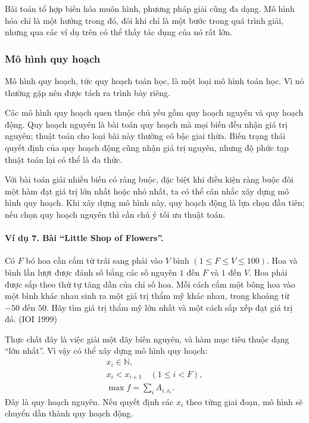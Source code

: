 \documentclass[11pt]{article}
\begin{document}
Bài toán tổ hợp biến hóa muôn hình, phương pháp giải cũng đa dạng. Mô hình hóa
chỉ là một hướng trong đó, đôi khi chỉ là một bước trong quá trình giải, nhưng
qua các ví dụ trên có thể thấy tác dụng của nó rất lớn.

\subsubsection{Mô hình quy hoạch}

Mô hình quy hoạch, tức quy hoạch toán học, là một loại mô hình toán học. Vì nó
thường gặp nên được tách ra trình bày riêng.

Các mô hình quy hoạch quen thuộc chủ yếu gồm quy hoạch nguyên và quy hoạch
động. Quy hoạch nguyên là bài toán quy hoạch mà mọi biến đều nhận giá trị
nguyên; thuật toán cho loại bài này thường có bậc giai thừa. Biến trạng thái
quyết định của quy hoạch động cũng nhận giá trị nguyên, nhưng độ phức tạp thuật
toán lại có thể là đa thức.

Với bài toán giải nhiều biến có ràng buộc, đặc biệt khi điều kiện ràng buộc
đòi một hàm đạt giá trị lớn nhất hoặc nhỏ nhất, ta có thể cân nhắc xây dựng mô
hình quy hoạch. Khi xây dựng mô hình này, quy hoạch động là lựa chọn đầu tiên;
nếu chọn quy hoạch nguyên thì cần chú ý tối ưu thuật toán.

\paragraph{Ví dụ 7. Bài ``Little Shop of Flowers''.}
\label{ex:flowers}
Có \(F\) bó hoa cần cắm từ trái sang phải vào \(V\) bình
\((1\le F\le V\le 100)\). Hoa và bình lần lượt được đánh số bằng các số nguyên
\(1\) đến \(F\) và \(1\) đến \(V\). Hoa phải được sắp theo thứ tự tăng dần của
chỉ số hoa. Mỗi cách cắm một bông hoa vào một bình khác nhau sinh ra một giá
trị thẩm mỹ khác nhau, trong khoảng từ \(-50\) đến \(50\). Hãy tìm giá trị
thẩm mỹ lớn nhất và một cách sắp xếp đạt giá trị đó. (IOI 1999)

Thực chất đây là việc giải một dãy biến nguyên, và hàm mục tiêu thuộc dạng
``lớn nhất''. Vì vậy có thể xây dựng mô hình quy hoạch:
\[
\begin{gathered}
  x_i\in\mathbb{N},\\
  x_i<x_{i+1}\quad (1\le i<F),\\
  \max f=\sum_i A_{i,x_i}.
\end{gathered}
\]
Đây là quy hoạch nguyên. Nếu quyết định các \(x_i\) theo từng giai đoạn, mô
hình sẽ chuyển dần thành quy hoạch động.
\end{document}
